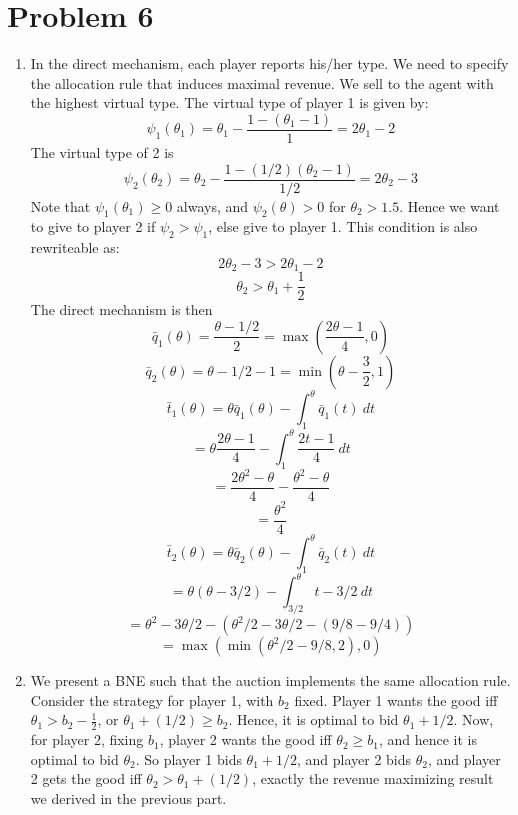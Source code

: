 \documentclass[10pt,letter]{article}
\begin{document}
\section*{Problem 6}
\begin{enumerate}[label=(\alph*)]
\item In the direct mechanism, each player reports his/her type. We need to specify the allocation rule that induces maximal revenue. We sell to the agent with the highest virtual type. The virtual type of player 1 is given by:
\[ \psi_1(\theta_1) = \theta_1 - \frac{1 - (\theta_1 - 1)}{1} = 2\theta_1 - 2 \]
The virtual type of 2 is
\[ \psi_2(\theta_2) = \theta_2 - \frac{1 - (1/2)(\theta_2 - 1)}{1/2} = 2\theta_2 - 3 \]
Note that $\psi_1(\theta_1) \ge 0$ always, and $\psi_2(\theta) > 0$ for $\theta_2 > 1.5$. Hence we want to give to player 2 if $\psi_2 > \psi_1$, else give to player 1. This condition is also rewriteable as:
\[ 2\theta_2 - 3 > 2\theta_1 - 2 \]
\[ \theta_2 > \theta_1 + \frac{1}{2}\]
The direct mechanism is then
\[ \bar{q}_1(\theta) = \frac{\theta - 1/2}{2} = \max\left(\frac{2\theta - 1}{4}, 0\right) \]
\[ \bar{q}_2(\theta) = \theta - 1/2 - 1 = \min\left(\theta - \frac{3}{2}, 1\right) \]
\[ \bar{t}_1(\theta) = \theta  \bar{q}_1(\theta) - \int_1^\theta \bar{q}_1(t) \ dt \]
\[  = \theta  \frac{2\theta - 1}{4} - \int_1^\theta \frac{2t - 1}{4} \ dt  \]
\[ =  \frac{2\theta^2 - \theta}{4} - \frac{\theta^2 - \theta}{4}  \]
\[ =  \frac{\theta^2}{4}   \]
\[ \bar{t}_2(\theta) = \theta \bar{q}_2(\theta) - \int_1^\theta \bar{q}_2(t) \ dt  \]
\[ = \theta (\theta - 3/2) - \int_{3/2}^\theta t - 3/2 \ dt \]
\[ = \theta^2 - 3\theta / 2 - (\theta^2 / 2 - 3\theta/2 - (9/8 - 9/4)) \]
\[ = \max(\min(\theta^2/ 2  - 9/8, 2), 0) \]
\item We present a BNE such that the auction implements the same allocation rule. Consider the strategy for player 1, with $b_2$ fixed. Player 1 wants the good iff $\theta_1 > b_2 - \frac{1}{2}$, or $\theta_1+ (1/2) \ge b_2$. Hence, it is optimal to bid $\theta_1 + 1/2$. Now, for player 2, fixing $b_1$, player 2 wants the good iff $\theta_2 \ge b_1$, and hence it is optimal to bid $\theta_2$. So player 1 bids $\theta_1 + 1/2$, and player 2 bids $\theta_2$, and player 2 gets the good iff $\theta_2 > \theta_1 + (1/2)$, exactly the revenue maximizing result we derived in the previous part.
\end{enumerate}
\end{document}
